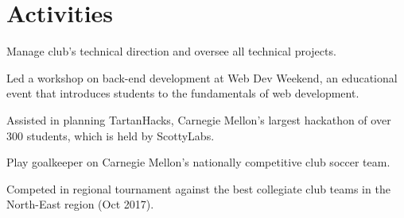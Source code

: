 \documentclass[]{openfont}
\begin{document}
\begin{minipage}[t]{0.59\textwidth}
\sectionsep


\section{Activities} 
\begin{tightemize}
    \item Manage club's technical direction and oversee all technical projects.
    \item Led a workshop on back-end development at Web Dev Weekend, an
        educational event that introduces students to the fundamentals of web
        development.
    \item Assisted in planning TartanHacks, Carnegie Mellon's largest hackathon of over 300 students, which is held by ScottyLabs.
\end{tightemize}

\sectionsep

\begin{tightemize}
    \item Play goalkeeper on Carnegie Mellon's nationally competitive club soccer team.
    \item Competed in regional tournament against the best collegiate club teams in the North-East region (Oct 2017).
\end{tightemize}

\sectionsep

\end{minipage} 
\end{document}
